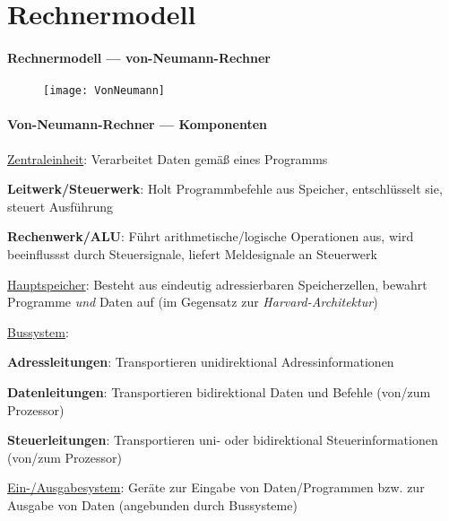 \section{Rechnermodell}
\label{sec:rechnermodell}

\paragraph{Rechnermodell --- von-Neumann-Rechner}
\begin{figure}[H]
  \centering
  \texttt{[image: VonNeumann]}
 \label{VonNeumann}
\end{figure}

\paragraph{Von-Neumann-Rechner --- Komponenten}
\begin{items}
	\item \underline{Zentraleinheit}: Verarbeitet Daten gemäß eines Programms
	\begin{enumeration}
		\item \textbf{Leitwerk/Steuerwerk}: Holt Programmbefehle aus Speicher, entschlüsselt sie, steuert Ausführung
		\item \textbf{Rechenwerk/ALU}: Führt arithmetische/logische Operationen aus, wird beeinflussst durch Steuersignale, liefert Meldesignale an Steuerwerk
	\end{enumeration}
	\item \underline{Hauptspeicher}: Besteht aus eindeutig adressierbaren Speicherzellen, bewahrt Programme \emph{und} Daten auf (im Gegensatz zur \emph{Harvard-Architektur})
	\item \underline{Bussystem}:
	\begin{enumeration}
		\item \textbf{Adressleitungen}: Transportieren unidirektional Adressinformationen
		\item \textbf{Datenleitungen}: Transportieren bidirektional Daten und Befehle (von/zum Prozessor)
		\item \textbf{Steuerleitungen}: Transportieren uni- oder bidirektional Steuerinformationen (von/zum Prozessor)
	\end{enumeration}
	\item \underline{Ein-/Ausgabesystem}: Geräte zur Eingabe von Daten/Programmen bzw. zur Ausgabe von Daten (angebunden durch Bussysteme)
\end{items}

